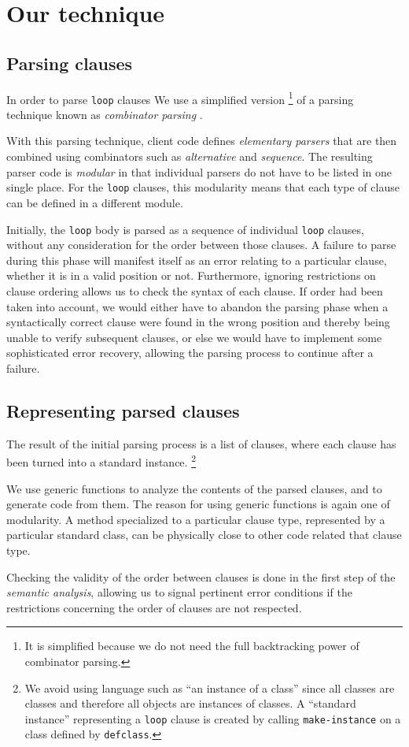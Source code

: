 \section{Our technique}
\label{sec-our-technique}

\subsection{Parsing clauses}

In order to parse \texttt{loop} clauses We use a simplified version%
\footnote{It is simplified because we do not need the full
  backtracking power of combinator parsing.}
of a parsing technique known as \emph{combinator parsing}
\cite{Wadler:1985:RFL:5280.5288}.

With this parsing technique, client code defines \emph{elementary
  parsers} that are then combined using combinators such as
\emph{alternative} and \emph{sequence}.  The resulting parser code is
\emph{modular} in that individual parsers do not have to be listed in
one single place.  For the \texttt{loop} clauses, this modularity
means that each type of clause can be defined in a different module.

Initially, the \texttt{loop} body is parsed as a sequence of
individual \texttt{loop} clauses, without any consideration for the
order between those clauses.  A failure to parse during this phase
will manifest itself as an error relating to a particular clause,
whether it is in a valid position or not.  Furthermore, ignoring
restrictions on clause ordering allows us to check the syntax of each
clause.  If order had been taken into account, we would either have to
abandon the parsing phase when a syntactically correct clause were
found in the wrong position and thereby being unable to verify
subsequent clauses, or else we would have to implement some
sophisticated error recovery, allowing the parsing process to continue
after a failure.

\subsection{Representing parsed clauses}

The result of the initial parsing process is a list of clauses, where
each clause has been turned into a standard instance.%
\footnote{We avoid using language such as ``an instance of a \clos{}
  class'' since all classes are \clos{} classes and therefore all
  \commonlisp{} objects are instances of \clos{} classes.  A
  ``standard instance'' representing a \texttt{loop} clause is created
  by calling \texttt{make-instance} on a class defined by
  \texttt{defclass}.}

We use generic functions to analyze the contents of the parsed
clauses, and to generate code from them.  The reason for using generic
functions is again one of modularity.  A method specialized to a
particular clause type, represented by a particular standard class,
can be physically close to other code related that clause type.

Checking the validity of the order between clauses is done in the
first step of the \emph{semantic analysis}, allowing us to signal
pertinent error conditions if the restrictions concerning the order of
clauses are not respected.
